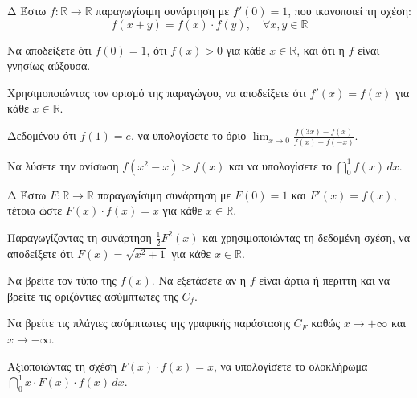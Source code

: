 \begin{thema}{Δ}
Έστω $f: \mathbb{R} \to \mathbb{R}$ παραγωγίσιμη συνάρτηση με $f'(0) = 1$, που ικανοποιεί τη σχέση:
\[ f(x+y) = f(x) \cdot f(y), \quad \forall x, y \in \mathbb{R} \]
\begin{erwthma}
    \item Να αποδείξετε ότι $f(0) = 1$, ότι $f(x) > 0$ για κάθε $x \in \mathbb{R}$, και ότι η $f$ είναι γνησίως αύξουσα.
    \item Χρησιμοποιώντας τον ορισμό της παραγώγου, να αποδείξετε ότι $f'(x) = f(x)$ για κάθε $x \in \mathbb{R}$.
    \item Δεδομένου ότι $f(1) = e$, να υπολογίσετε το όριο $\displaystyle\lim_{x \to 0} \frac{f(3x) - f(x)}{f(x) - f(-x)}$.
    \item Να λύσετε την ανίσωση $f(x^2 - x) > f(x)$ και να υπολογίσετε το $\displaystyle\dint_0^1 f(x)\,dx$.
\end{erwthma}
\end{thema}

\begin{thema}{Δ}
Έστω $F: \mathbb{R} \to \mathbb{R}$ παραγωγίσιμη συνάρτηση με $F(0) = 1$ και $F'(x) = f(x)$, τέτοια ώστε $F(x) \cdot f(x) = x$ για κάθε $x \in \mathbb{R}$.
\begin{erwthma}
    \item Παραγωγίζοντας τη συνάρτηση $\tfrac{1}{2}F^2(x)$ και χρησιμοποιώντας τη δεδομένη σχέση, να αποδείξετε ότι $F(x) = \sqrt{x^2+1}$ για κάθε $x \in \mathbb{R}$.
    \item Να βρείτε τον τύπο της $f(x)$. Να εξετάσετε αν η $f$ είναι άρτια ή περιττή και να βρείτε τις οριζόντιες ασύμπτωτες της $C_f$.
    \item Να βρείτε τις πλάγιες ασύμπτωτες της γραφικής παράστασης $C_F$ καθώς $x \to +\infty$ και $x \to -\infty$.
    \item Αξιοποιώντας τη σχέση $F(x) \cdot f(x) = x$, να υπολογίσετε το ολοκλήρωμα $\displaystyle\dint_0^1 x \cdot F(x) \cdot f(x)\,dx$.
\end{erwthma}
\end{thema}

